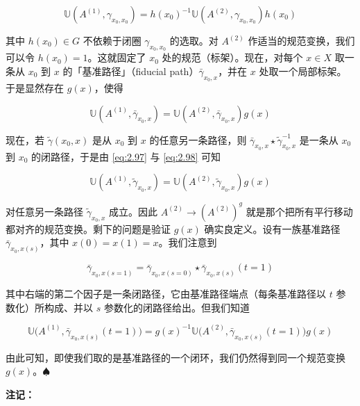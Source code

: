 \begin{equation}
  \mathbb{U}(A^{(1)},\gamma_{x_0,x_0})=h(x_0)^{-1}\mathbb{U}(A^{(2)},\gamma_{x_0,x_0})h(x_0)
  \tag{2.97}
  \label{eq:2.97}
\end{equation}

其中 $h(x_0)\in G$ 不依赖于闭圈 $\gamma_{x_0,x_0}$ 的选取。对 $A^{(2)}$ 作适当的规范变换，我们可以令 $h(x_0)=1$。这就固定了 $x_0$ 处的规范（标架）。现在，对每个 $x\in X$ 取一条从 $x_0$ 到 $x$ 的「基准路径」（fiducial path）$\bar\gamma_{x_0,x}$，并在 $x$ 处取一个局部标架。于是显然存在 $g(x)$，使得

\begin{equation}
  \mathbb{U}(A^{(1)},\bar\gamma_{x_0,x})=\mathbb{U}(A^{(2)},\bar\gamma_{x_0,x})g(x)
  \tag{2.98}
  \label{eq:2.98}
\end{equation}

现在，若 $\tilde\gamma(x_0,x)$ 是从 $x_0$ 到 $x$ 的任意另一条路径，则 $\bar\gamma_{x_0,x}\star\tilde\gamma_{x_0,x}^{-1}$ 是一条从 $x_0$ 到 $x_0$ 的闭路径，于是由 \eqref{eq:2.97} 与 \eqref{eq:2.98} 可知

\begin{equation}
  \mathbb{U}(A^{(1)},\tilde\gamma_{x_0,x})=\mathbb{U}(A^{(2)},\tilde\gamma_{x_0,x})g(x)
  \tag{2.99}
  \label{eq:2.99}
\end{equation}

对任意另一条路径 $\tilde\gamma_{x_0,x}$ 成立。因此 $A^{(2)}\to(A^{(2)})^{g}$ 就是那个把所有平行移动都对齐的规范变换。剩下的问题是验证 $g(x)$ 确实良定义。设有一族基准路径 $\bar\gamma_{x_0,x(s)}$，其中 $x(0)=x(1)=x$。我们注意到

\begin{equation}
  \bar\gamma_{x_0,x(s=1)}=\bar\gamma_{x_0,x(s=0)}\star\bar\gamma_{x_0,x(s)}(t=1)
  \tag{2.100}
  \label{eq:2.100}
\end{equation}

其中右端的第二个因子是一条闭路径，它由基准路径端点（每条基准路径以 $t$ 参数化）所构成、并以 $s$ 参数化的闭路径给出。但我们知道

\begin{equation}
  \mathbb{U}\big(A^{(1)},\bar\gamma_{x_0,x(s)}(t=1)\big)=g(x)^{-1}\mathbb{U}\big(A^{(2)},\bar\gamma_{x_0,x(s)}(t=1)\big)g(x)
  \tag{2.101}
  \label{eq:2.101}
\end{equation}

由此可知，即使我们取的是基准路径的一个闭环，我们仍然得到同一个规范变换 $g(x)$。$\spadesuit$

\textbf{注记：}

